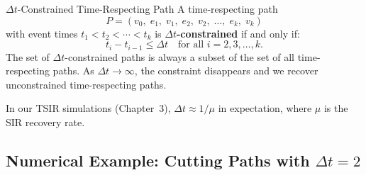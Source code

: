\begin{mathbox}{$\Delta t$-Constrained Time-Respecting Path}
A time-respecting path
\[
  P = (v_0,\; e_1,\; v_1,\; e_2,\; v_2,\; \ldots,\; e_k,\; v_k)
\]
with event times $t_1 < t_2 < \cdots < t_k$ is \textbf{$\Delta t$-constrained} if and only
if:
\[
  t_i - t_{i-1} \leq \Delta t \quad \text{for all } i = 2, 3, \ldots, k.
\]
The set of $\Delta t$-constrained paths is always a subset of the set of all time-respecting
paths. As $\Delta t \to \infty$, the constraint disappears and we recover unconstrained
time-respecting paths.

In our TSIR simulations (Chapter~3), $\Delta t \approx 1/\mu$ in expectation, where $\mu$ is
the SIR recovery rate.
\end{mathbox}

\subsection{Numerical Example: Cutting Paths with $\Delta t = 2$}

